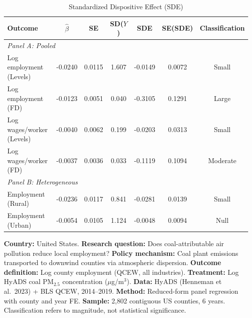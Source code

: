 \begin{table}[t]
\centering
\caption{Standardized Dispositive Effect (SDE)}
\label{tab:sde}
\begin{tabular}{lcccccc}
\hline\hline
Outcome & $\hat{\beta}$ & SE & SD($Y$) & SDE & SE(SDE) & Classification \\
\hline
\multicolumn{7}{l}{\textit{Panel A: Pooled}} \\
Log employment (Levels) & -0.0240 & 0.0115 & 1.607 & -0.0149 & 0.0072 & Small \\
Log employment (FD) & -0.0123 & 0.0051 & 0.040 & -0.3105 & 0.1291 & Large \\
Log wages/worker (Levels) & -0.0040 & 0.0062 & 0.199 & -0.0203 & 0.0313 & Small \\
Log wages/worker (FD) & -0.0037 & 0.0036 & 0.033 & -0.1119 & 0.1094 & Moderate \\
\hline
\multicolumn{7}{l}{\textit{Panel B: Heterogeneous}} \\
Employment (Rural) & -0.0236 & 0.0117 & 0.841 & -0.0281 & 0.0139 & Small \\
Employment (Urban) & -0.0054 & 0.0105 & 1.124 & -0.0048 & 0.0094 & Null \\
\hline\hline
\end{tabular}
\begin{flushleft}\small
\textbf{Country:} United States. \textbf{Research question:} Does coal-attributable air pollution reduce local employment? \textbf{Policy mechanism:} Coal plant emissions transported to downwind counties via atmospheric dispersion. \textbf{Outcome definition:} Log county employment (QCEW, all industries). \textbf{Treatment:} Log HyADS coal PM$_{2.5}$ concentration ($\mu$g/m$^3$). \textbf{Data:} HyADS (Henneman et al.\ 2023) + BLS QCEW, 2014--2019. \textbf{Method:} Reduced-form panel regression with county and year FE. \textbf{Sample:} 2,802 contiguous US counties, 6 years. Classification refers to magnitude, not statistical significance.
\end{flushleft}
\end{table}
